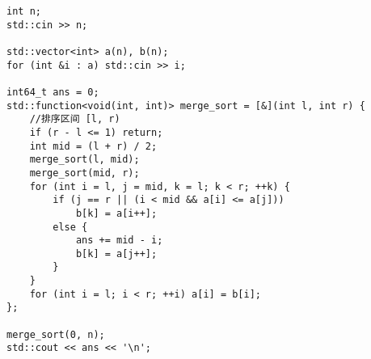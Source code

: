 \begin{lstlisting}
int n;
std::cin >> n;

std::vector<int> a(n), b(n);
for (int &i : a) std::cin >> i;

int64_t ans = 0;
std::function<void(int, int)> merge_sort = [&](int l, int r) {
	//排序区间 [l, r)
	if (r - l <= 1) return;
	int mid = (l + r) / 2;
	merge_sort(l, mid);
	merge_sort(mid, r);
	for (int i = l, j = mid, k = l; k < r; ++k) {
		if (j == r || (i < mid && a[i] <= a[j]))
			b[k] = a[i++];
		else {
			ans += mid - i;
			b[k] = a[j++];
		}
	}
	for (int i = l; i < r; ++i) a[i] = b[i];
};

merge_sort(0, n);
std::cout << ans << '\n';
\end{lstlisting}